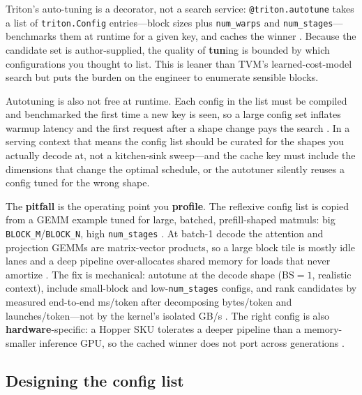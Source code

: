 Triton's auto-tuning is a decorator, not a search service: \texttt{@triton.autotune} takes a list of \texttt{triton.Config} entries---block sizes plus \texttt{num\_warps} and \texttt{num\_stages}---benchmarks them at runtime for a given key, and caches the winner \citep{tritonlang2024}. Because the candidate set is author-supplied, the quality of \textbf{tun}ing is bounded by which configurations you thought to list. This is leaner than TVM's learned-cost-model search but puts the burden on the engineer to enumerate sensible blocks.

Autotuning is also not free at runtime. Each config in the list must be compiled and benchmarked the first time a new key is seen, so a large config set inflates warmup latency and the first request after a shape change pays the search \citep{tritonlang2024}. In a serving context that means the config list should be curated for the shapes you actually decode at, not a kitchen-sink sweep---and the cache key must include the dimensions that change the optimal schedule, or the autotuner silently reuses a config tuned for the wrong shape.

The \textbf{pitfall} is the operating point you \textbf{profile}. The reflexive config list is copied from a GEMM example tuned for large, batched, prefill-shaped matmuls: big \texttt{BLOCK\_M}/\texttt{BLOCK\_N}, high \texttt{num\_stages} \citep{kwon2023vllm}. At batch-1 decode the attention and projection GEMMs are matrix-vector products, so a large block tile is mostly idle lanes and a deep pipeline over-allocates shared memory for loads that never amortize \citep{taxbreak2026,memoryfloor2026}. The fix is mechanical: autotune at the decode shape (BS${=}1$, realistic context), include small-block and low-\texttt{num\_stages} configs, and rank candidates by measured end-to-end ms/token after decomposing bytes/token and launches/token---not by the kernel's isolated GB/s \citep{patel2025llminference,dlbook}. The right config is also \textbf{hardware}-specific: a Hopper SKU tolerates a deeper pipeline than a memory-smaller inference GPU, so the cached winner does not port across generations \citep{nvidia2022hopper}.

\subsection{Designing the config list}

